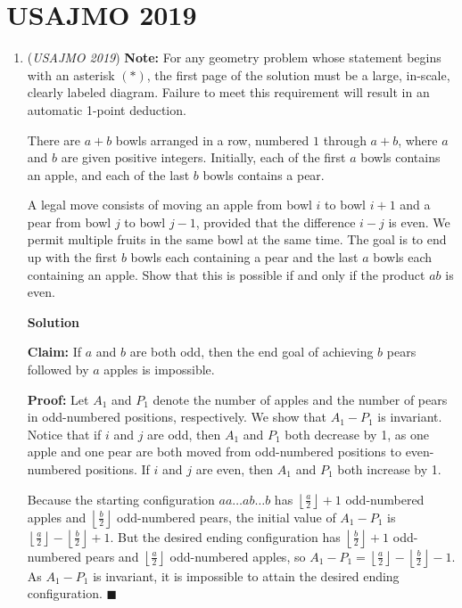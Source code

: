 \section{USAJMO 2019}
        \begin{enumerate}
        	\item (\textit{USAJMO 2019}) \textbf{Note:} For any geometry problem whose statement begins with an asterisk $(*)$, the first page of the solution must be a large, in-scale, clearly labeled diagram. Failure to meet this requirement will result in an automatic 1-point deduction.


 There are $a+b$ bowls arranged in a row, numbered $1$ through $a+b$, where $a$ and $b$ are given positive integers. Initially, each of the first $a$ bowls contains an apple, and each of the last $b$ bowls contains a pear.


 A legal move consists of moving an apple from bowl $i$ to bowl $i+1$ and a pear from bowl $j$ to bowl $j-1$, provided that the difference $i-j$ is even. We permit multiple fruits in the same bowl at the same time. The goal is to end up with the first $b$ bowls each containing a pear and the last $a$ bowls each containing an apple. Show that this is possible if and only if the product $ab$ is even.


 



\textbf{Solution}

\textbf{Claim:} If $a$ and $b$ are both odd, then the end goal of achieving $b$ pears followed by $a$ apples is impossible.

 \textbf{Proof:} Let $A_1$ and $P_1$ denote the number of apples and the number of pears in odd-numbered positions, respectively. We show that $A_1 - P_1$ is invariant. Notice that if $i$ and $j$ are odd, then $A_1$ and $P_1$ both decrease by 1, as one apple and one pear are both moved from odd-numbered positions to even-numbered positions. If $i$ and $j$ are even, then $A_1$ and $P_1$ both increase by 1.

 Because the starting configuration $aa\ldots ab\ldots b$ has $\left\lfloor \frac{a}{2} \right\rfloor + 1$ odd-numbered apples and $\left\lfloor \frac{b}{2} \right\rfloor$ odd-numbered pears, the initial value of $A_1 - P_1$ is $\left\lfloor \frac{a}{2} \right\rfloor - \left\lfloor \frac{b}{2} \right\rfloor + 1$. But the desired ending configuration has $\left\lfloor \frac{b}{2}\right\rfloor + 1$ odd-numbered pears and $\left\lfloor \frac{a}{2} \right\rfloor$ odd-numbered apples, so $A_1 - P_1 = \left\lfloor \frac{a}{2} \right\rfloor - \left\lfloor \frac{b}{2} \right\rfloor - 1$. As $A_1 - P_1$ is invariant, it is impossible to attain the desired ending configuration. $\blacksquare$


\end{enumerate}
